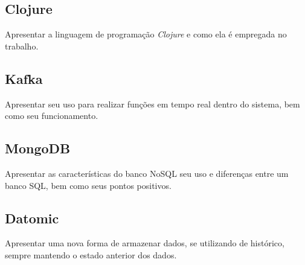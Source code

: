 \subsection{Clojure}
Apresentar a linguagem de programação \textit{Clojure} e como ela é empregada no trabalho.

\subsection{Kafka}
Apresentar seu uso para realizar funções em tempo real dentro do sistema, bem como seu funcionamento.

\subsection{MongoDB}
Apresentar as características do banco NoSQL seu uso e diferenças entre um banco SQL, bem como seus pontos positivos.

\subsection{Datomic}
Apresentar uma nova forma de armazenar dados, se utilizando de histórico, sempre mantendo o estado anterior dos dados.

